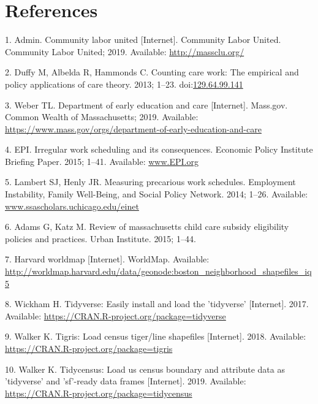 \documentclass[10pt,letterpaper]{article}
\begin{document}
\section*{References}\label{references.unumbered}

\hypertarget{refs}{}
\hypertarget{ref-CLU}{}
1. Admin. Community labor united {[}Internet{]}. Community Labor United.
Community Labor United; 2019. Available: \url{http://massclu.org/}

\hypertarget{ref-duffy_albelda_hammonds_2013}{}
2. Duffy M, Albelda R, Hammonds C. Counting care work: The empirical and
policy applications of care theory. 2013; 1--23.
doi:\href{https://doi.org/129.64.99.141}{129.64.99.141}

\hypertarget{ref-EEC}{}
3. Weber TL. Department of early education and care {[}Internet{]}.
Mass.gov. Common Wealth of Massachusetts; 2019. Available:
\url{https://www.mass.gov/orgs/department-of-early-education-and-care}

\hypertarget{ref-epi_2015}{}
4. EPI. Irregular work scheduling and its consequences. Economic Policy
Institute Briefing Paper. 2015; 1--41. Available: \url{www.EPI.org}

\hypertarget{ref-lambert_henly_2014}{}
5. Lambert SJ, Henly JR. Measuring precarious work schedules. Employment
Instability, Family Well-Being, and Social Policy Network. 2014; 1--26.
Available: \url{www.ssascholars.uchicago.edu/einet}

\hypertarget{ref-adams_katz_2015}{}
6. Adams G, Katz M. Review of massachusetts child care subsidy
eligibility policies and practices. Urban Institute. 2015; 1--44.

\hypertarget{ref-bostonshapefile}{}
7. Harvard worldmap {[}Internet{]}. WorldMap. Available:
\url{http://worldmap.harvard.edu/data/geonode:boston_neighborhood_shapefiles_iq5}

\hypertarget{ref-R-tidyverse}{}
8. Wickham H. Tidyverse: Easily install and load the 'tidyverse'
{[}Internet{]}. 2017. Available:
\url{https://CRAN.R-project.org/package=tidyverse}

\hypertarget{ref-R-tigris}{}
9. Walker K. Tigris: Load census tiger/line shapefiles {[}Internet{]}.
2018. Available: \url{https://CRAN.R-project.org/package=tigris}

\hypertarget{ref-R-tidycensus}{}
10. Walker K. Tidycensus: Load us census boundary and attribute data as
'tidyverse' and 'sf'-ready data frames {[}Internet{]}. 2019. Available:
\url{https://CRAN.R-project.org/package=tidycensus}
\end{document}
